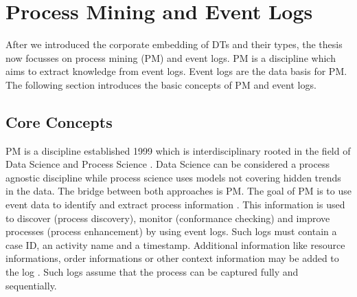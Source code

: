 \section{Process Mining and Event Logs}
\label{sec:process-mining}
After we introduced the corporate embedding of DTs and their types, the thesis now focusses on process mining (PM) and event logs. PM is a discipline which aims to extract knowledge from event logs. Event logs are the data basis for PM. The following section introduces the basic concepts of PM and event logs.

\subsection{Core Concepts}
\label{sec:core-concepts}
PM is a discipline established 1999 which is interdisciplinary rooted in the field of Data Science and Process Science \parencite{van2016data}. Data Science can be considered a process agnostic discipline \parencite{van2016data} while process science uses models not covering hidden trends in the data. The bridge between both approaches is PM. The goal of PM is to use event data to identify and extract process information \parencite{vanderAalst2012}. This information is used to discover (process discovery), monitor (conformance checking) and improve processes (process enhancement) \parencite{vanderAalst2012} by using event logs. Such logs must contain a case ID, an activity name and a timestamp. Additional information like resource informations, order informations or other context information may be added to the log \parencite{vanderAalst2012}. Such logs assume that the process can be captured fully and sequentially.

